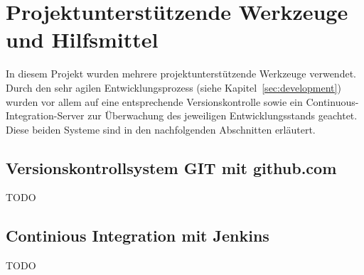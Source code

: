 \section{Projektunterstützende Werkzeuge und Hilfsmittel}
\label{sec:tools}

In diesem Projekt wurden mehrere projektunterstützende Werkzeuge verwendet.
	Durch den sehr agilen Entwicklungsprozess (siehe Kapitel~\ref{sec:development})
	wurden vor allem auf eine entsprechende Versionskontrolle sowie ein
	Continuous-Integration-Server zur Überwachung des jeweiligen Entwicklungsstands
	geachtet. Diese beiden Systeme sind in den nachfolgenden Abschnitten erläutert.

\subsection{Versionskontrollsystem GIT mit github.com}
\label{subsec:git}

TODO

\subsection{Continious Integration mit Jenkins}
\label{subsec:ci}

TODO


